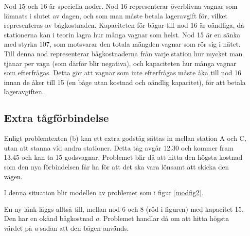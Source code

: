 \documentclass[a4paper,titlepage,12pt]{article}
\begin{document}
Nod 15 och 16 är speciella noder. Nod 16 representerar överblivna vagnar som
lämnats i slutet av dagen, och som man måste betala lageravgift för, vilket
representeras av bågkostnaden. Kapaciteten för bågar till nod 16 är oändliga,
då stationerna kan i teorin lagra hur många vagnar som helst. Nod 15 är en
sänka med styrka 107, som motsvarar den totala mängden vagnar som rör sig i
nätet.  Till denna nod representerar bågkostnaderna från varje station hur mycket man
tjänar per vagn (som därför blir negativa), och kapaciteten hur många vagnar
som efterfrågas. Detta gör att vagnar som inte efterfrågas måste åka till nod
16 innan de åker till 15 (en båge utan kostnad och oändlig kapacitet), 
för att betala lageravgiften.

\subsection*{Extra tågförbindelse}
Enligt problemtexten (b) kan ett extra godståg sättas in mellan station A och C,
utan att stanna vid andra stationer. Detta tåg avgår 12.30 och kommer fram
13.45 och kan ta 15 godsvagnar. Problemet blir då att hitta den högsta kostnad
som den nya förbindelsen får ha för att det ska vara lönsamt att skicka den
vägen.

I denna situation blir modellen av problemet som i figur \ref{modfig2}.

En ny länk läggs alltså till, mellan nod 6 och 8 (röd i figuren) med kapacitet
15. Den har en okänd bågkostnad \textit{a}. Problemet handlar då om att hitta
högsta värdet på \textit{a} sådan att den bågen används.
\end{document}
